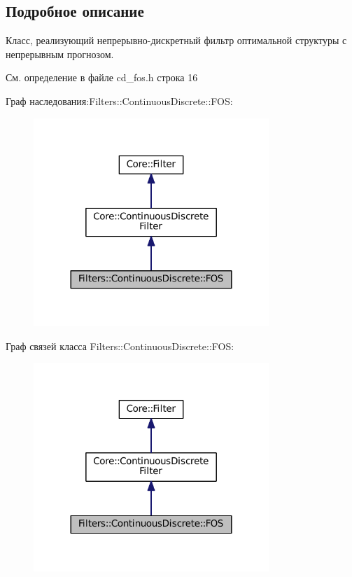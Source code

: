 \subsection{Подробное описание}
Класс, реализующий непрерывно-\/дискретный фильтр оптимальной структуры с непрерывным прогнозом. 

См. определение в файле cd\+\_\+fos.\+h строка 16



Граф наследования\+:Filters\+:\+:Continuous\+Discrete\+:\+:F\+OS\+:\nopagebreak
\begin{figure}[H]
\begin{center}
\leavevmode
\includegraphics[width=252pt]{class_filters_1_1_continuous_discrete_1_1_f_o_s__inherit__graph}
\end{center}
\end{figure}


Граф связей класса Filters\+:\+:Continuous\+Discrete\+:\+:F\+OS\+:\nopagebreak
\begin{figure}[H]
\begin{center}
\leavevmode
\includegraphics[width=252pt]{class_filters_1_1_continuous_discrete_1_1_f_o_s__coll__graph}
\end{center}
\end{figure}


